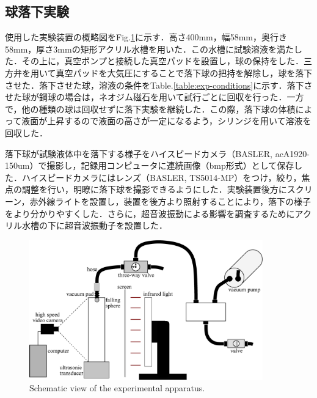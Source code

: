 \newpage

\subsection{球落下実験}

使用した実験装置の概略図をFig.\ref{fig:device}に示す．高さ400mm，幅58mm，奥行き58mm，厚さ3mmの矩形アクリル水槽を用いた．この水槽に試験溶液を満たした．その上に，真空ポンプと接続した真空パッドを設置し，球の保持をした．三方弁を用いて真空パッドを大気圧にすることで落下球の把持を解除し，球を落下させた．落下させた球，溶液の条件をTable.\ref{table:exp-conditions}に示す．落下させた球が鋼球の場合は，ネオジム磁石を用いて試行ごとに回収を行った．一方で，他の種類の球は回収せずに落下実験を継続した．この際，落下球の体積によって液面が上昇するので液面の高さが一定になるよう，シリンジを用いて溶液を回収した．

落下球が試験液体中を落下する様子をハイスピードカメラ（BASLER, acA1920-150um）で撮影し，記録用コンピュータに連続画像（bmp形式）として保存した．ハイスピードカメラにはレンズ（BASLER, TS5014-MP）をつけ，絞り，焦点の調整を行い，明瞭に落下球を撮影できるようにした．実験装置後方にスクリーン，赤外線ライトを設置し，装置を後方より照射することにより，落下の様子をより分かりやすくした．さらに，超音波振動による影響を調査するためにアクリル水槽の下に超音波振動子を設置した．

\begin{figure}[h]
    \centering
    \includegraphics[width=0.9\textwidth]{2-Methods/device-vacuum.eps}
    \caption{Schematic view of the experimental apparatus.}
    \label{fig:device}
\end{figure}

